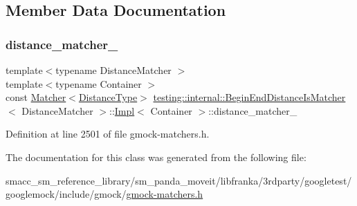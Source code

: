 \subsection{Member Data Documentation}
\mbox{\label{classtesting_1_1internal_1_1BeginEndDistanceIsMatcher_1_1Impl_acc8d923e6901fa9c75bf76825b2baa6b}} 
\subsubsection{\texorpdfstring{distance\+\_\+matcher\+\_\+}{distance\_matcher\_}}
{\footnotesize\ttfamily template$<$typename Distance\+Matcher $>$ \\
template$<$typename Container $>$ \\
const \hyperlink{classtesting_1_1Matcher}{Matcher}$<$\hyperlink{classtesting_1_1internal_1_1BeginEndDistanceIsMatcher_1_1Impl_a10d901c49e2793dae6bcce6fa1a4e9fe}{Distance\+Type}$>$ \hyperlink{classtesting_1_1internal_1_1BeginEndDistanceIsMatcher}{testing\+::internal\+::\+Begin\+End\+Distance\+Is\+Matcher}$<$ Distance\+Matcher $>$\+::\hyperlink{classtesting_1_1internal_1_1BeginEndDistanceIsMatcher_1_1Impl}{Impl}$<$ Container $>$\+::distance\+\_\+matcher\+\_\+\hspace{0.3cm}{\ttfamily [private]}}



Definition at line 2501 of file gmock-\/matchers.\+h.



The documentation for this class was generated from the following file\+:\begin{DoxyCompactItemize}
\item 
smacc\+\_\+sm\+\_\+reference\+\_\+library/sm\+\_\+panda\+\_\+moveit/libfranka/3rdparty/googletest/googlemock/include/gmock/\hyperlink{gmock-matchers_8h}{gmock-\/matchers.\+h}\end{DoxyCompactItemize}
